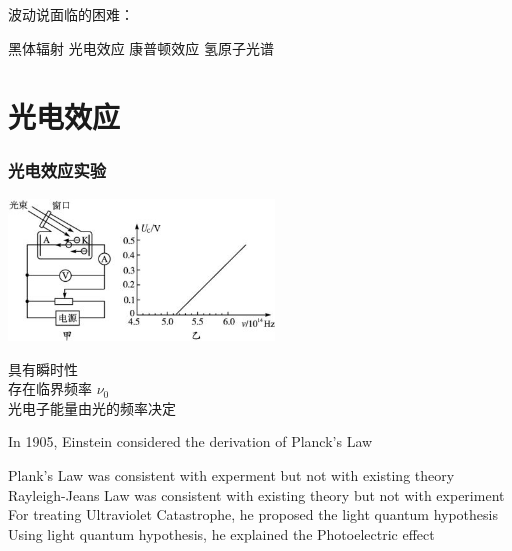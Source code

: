 \begin{frame} 
    波动说面临的困难：
    \begin{itemize}
        \Item  黑体辐射
        \Item  光电效应
        \Item  康普顿效应
        \Item  氢原子光谱
    \end{itemize}
\end{frame}

\section{光电效应}
\begin{frame} 
    \frametitle{光电效应实验}   
    \begin{center}
       \includegraphics[width=0.53\textwidth]{figs/2021-12-02-16-01-21.png}
   \end{center}  
   \bullet 具有瞬时性 \\
   \bullet 存在临界频率 $\nu_0$ \\
   \bullet 光电子能量由光的频率决定
\end{frame}  

\begin{frame} 
    In 1905, Einstein considered the derivation of Planck's Law  \\
    \begin{itemize}
        \Item  Plank’s Law was consistent with experment but not with existing theory
        \Item  Rayleigh-Jeans Law was consistent with existing theory but not with experiment
        \Item  For treating Ultraviolet Catastrophe, he proposed the light quantum hypothesis
        \Item  Using light quantum hypothesis, he explained the Photoelectric effect
    \end{itemize}
\end{frame}

